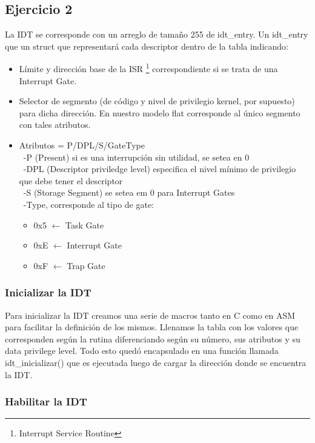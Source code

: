 \subsection{Ejercicio 2}

La IDT se corresponde con un arreglo de tamaño 255 de idt_entry. Un idt_entry que un struct que representará cada descriptor dentro de la tabla indicando: 
\begin{itemize}
    \item Límite y dirección base de la ISR \footnote{Interrupt Service Routine} correspondiente si se trata de una Interrupt Gate.
    \item Selector de segmento (de código y nivel de privilegio kernel, por supuesto) para dicha dirección. En nuestro modelo flat corresponde al único segmento con tales atributos. 
    \item Atributos = P/DPL/S/GateType \\
    \ -P (Present) si es una interrupción sin utilidad, se setea en 0 \\
    \ -DPL (Descriptor priviledge level) especifica el nivel mínimo de privilegio que debe tener el descriptor \\
    \ -S (Storage Segment) se setea em 0 para Interrupt Gates \\
    \ -Type, corresponde al tipo de gate: \\
    \begin{itemize}
    	\item	0x5 $\gets$ Task Gate
    	\item	0xE $\gets$ Interrupt Gate
    	\item	0xF $\gets$ Trap Gate
    \end{itemize}
    
\end{itemize}


\subsubsection{Inicializar la IDT}



Para inicializar la IDT creamos una serie de macros tanto en C como en ASM para facilitar la definición de los mismos.
Llenamos la tabla con los valores que corresponden según la rutina diferenciando según su número, sus atributos y su data privilege level.
Todo esto quedó encapsulado en una función llamada idt_inicializar() que es ejecutada luego de cargar la dirección donde se encuentra la IDT.



\subsubsection{Habilitar la IDT}

